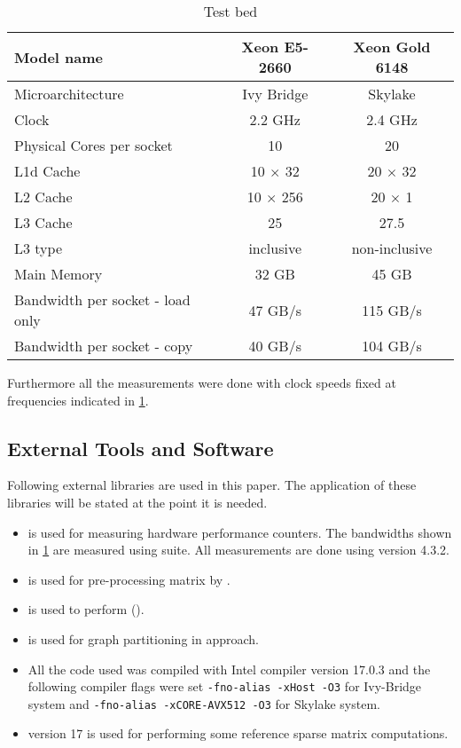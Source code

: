 \begin{table}[tbhp]
	\footnotesize
	\caption{Test bed}\label{tab:test_bed}
	\begin{center}
		\begin{tabular}{|l| c  c |}
			\toprule
			{Model name} & {Xeon\textsuperscript{\textregistered} E5-2660} & {Xeon\textsuperscript{\textregistered} Gold 6148} \\
			\midrule
			{Microarchitecture} & {Ivy Bridge} & {Skylake} \\
			\midrule
			{Clock} & {2.2 GHz} & {2.4 GHz}\\
			{Physical Cores per socket} & {10} & {20} \\
			{L1d Cache} & {10 $\times$ 32 \KB} & {20 $\times$ 32 \KB}\\
			{L2 Cache} & {10 $\times$ 256 \KB} & {20 $\times$ 1 \MB} \\
			{L3 Cache} & {25 \MB} & {27.5 \MB}\\
			{L3 type} & {inclusive} & {non-inclusive}\\
			{Main Memory} & {32 GB} & {45 GB}\\
			{Bandwidth per socket - load only} & {47 GB/s} & {115 GB/s}\\ %
			{Bandwidth per socket - copy} & {40 GB/s} & {104 GB/s}\\
			\bottomrule
		\end{tabular}
	\end{center}
\end{table} 

Furthermore all the measurements were done with  \CPU clock speeds fixed at frequencies indicated in \cref{tab:test_bed}.


\subsection{External Tools and Software}
Following external libraries are used in this paper. The application of these libraries will be stated at the point it is needed.
\begin{itemize}
	\item \LIKWID \cite{LIKWID}   is used for measuring hardware performance counters. The bandwidths shown in \cref{tab:test_bed} are measured using \likwidBench suite. All measurements are done using \LIKWID version 4.3.2.
	\item \COLPACK \cite{COLPACK} is used for pre-processing matrix by \MCfull.
	\item \SPMP \cite{SpMP} is used to perform \RCMfull (\RCM).
	\item \METIS\cite{METIS} is used for graph partitioning in \ABMC approach.
	\item All the code used was compiled with Intel compiler version 17.0.3 and the following compiler flags were set {\tt -fno-alias -xHost -O3} for Ivy-Bridge system and {\tt -fno-alias -xCORE-AVX512 -O3} for Skylake system.
	\item \MKL \cite{MKL} version 17 is used for performing some reference sparse matrix computations.
\end{itemize}

